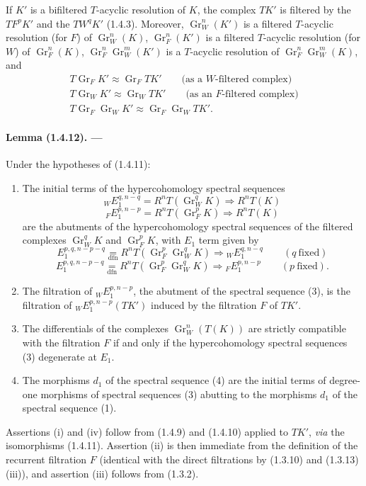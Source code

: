 \documentclass[10pt]{article}
\newcommand{\Gr}{\operatorname{Gr}}
\begin{document}
If $K'$ is a bifiltered $T$-acyclic resolution of $K$, the complex $TK'$ is filtered by the $TF^pK'$ and the $TW^qK'$ (1.4.3). Moreover, $\Gr_W^n(K')$ is a filtered $T$-acyclic resolution (for $F$) of $\Gr_W^n(K)$, $\Gr_F^n(K')$ is a filtered $T$-acyclic resolution (for $W$) of $\Gr_F^n(K)$, $\Gr_F^n\Gr_W^m(K')$ is a $T$-acyclic resolution of $\Gr_F^n\Gr_W^m(K)$, and
\[
\begin{gathered}
T\Gr_FK'\approx\Gr_FTK'\qquad\text{(as a $W$-filtered complex)}\\
T\Gr_WK'\approx\Gr_WTK'\qquad\text{(as an $F$-filtered complex)}\\
T\Gr_F\Gr_WK'\approx\Gr_F\Gr_WTK'.
\end{gathered}
\]

\paragraph{Lemma (1.4.12). ---} Under the hypotheses of (1.4.11):
\begin{enumerate}[label=(\roman*)]
\item The initial terms of the hypercohomology spectral sequences
\[
\tag{1}
{}_WE_1^{q,n-q}=R^nT(\Gr_W^qK)\Rightarrow R^nT(K)
\]
\[
\tag{2}
{}_FE_1^{p,n-p}=R^nT(\Gr_F^pK)\Rightarrow R^nT(K)
\]
are the abutments of the hypercohomology spectral sequences of the filtered complexes $\Gr_W^qK$ and $\Gr_F^pK$, with $E_1$ term given by
\[
\tag{3}
E_1^{p,q,n-p-q}\underset{\mathrm{dfn}}{=}R^nT(\Gr_F^p\Gr_W^qK)\Rightarrow {}_WE_1^{q,n-q}\qquad(q\ \text{fixed})
\]
\[
\tag{4}
E_1^{p,q,n-p-q}\underset{\mathrm{dfn}}{=}R^nT(\Gr_F^p\Gr_W^qK)\Rightarrow {}_FE_1^{p,n-p}\qquad(p\ \text{fixed}).
\]
\item The filtration of ${}_WE_1^{p,n-p}$, the abutment of the spectral sequence (3), is the filtration of ${}_WE_1^{p,n-p}(TK')$ induced by the filtration $F$ of $TK'$.
\item The differentials of the complexes $\Gr_W^n(T(K))$ are strictly compatible with the filtration $F$ if and only if the hypercohomology spectral sequences (3) degenerate at $E_1$.
\item The morphisms $d_1$ of the spectral sequence (4) are the initial terms of degree-one morphisms of spectral sequences (3) abutting to the morphisms $d_1$ of the spectral sequence (1).
\end{enumerate}
Assertions (i) and (iv) follow from (1.4.9) and (1.4.10) applied to $TK'$, \emph{via} the isomorphisms (1.4.11). Assertion (ii) is then immediate from the definition of the recurrent filtration $F$ (identical with the direct filtrations by (1.3.10) and (1.3.13) (iii)), and assertion (iii) follows from (1.3.2).
\end{document}
